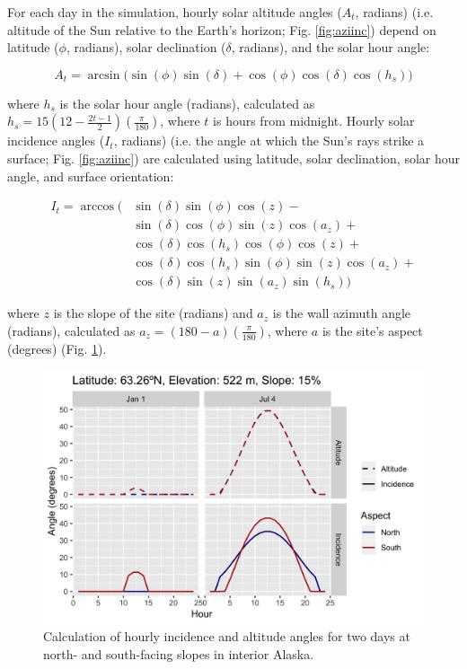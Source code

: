 \documentclass[a4paper, 12pt] {report}
\begin{document}
For each day in the simulation, hourly solar altitude angles ($A_t$, radians) (i.e. altitude of the Sun relative to the Earth's horizon; Fig. \ref{fig:aziinc}) depend on latitude ($\phi$, radians), solar declination ($\delta$, radians), and the solar hour angle: 

\begin{equation}
A_t = \arcsin{\Big(\sin{(\phi)}\sin{(\delta)} + \cos{(\phi)}\cos{(\delta)}\cos{(h_s)}\Big)}
\end{equation}

where $h_s$ is the solar hour angle (radians), calculated as $h_s = 15(12 - \frac{2t - 1}{2})(\frac{\pi}{180})$, where $t$ is hours from midnight. Hourly solar incidence angles ($I_t$, radians) (i.e. the angle at which the Sun's rays strike a surface; Fig. \ref{fig:aziinc}) are calculated using latitude, solar declination, solar hour angle, and surface orientation:

\begin{equation}
  \begin{split}
    I_t = \arccos\Big( & \sin{(\delta)}\sin{(\phi)}\cos{(z)} - \\
    & \sin{(\delta)}\cos{(\phi)}\sin{(z)}\cos{(a_z)} +  \\
     &  \cos{(\delta)}\cos{(h_s)}\cos{(\phi)}\cos{(z)} + \\
     & \cos{(\delta)}\cos{(h_s)}\sin{(\phi)}\sin{(z)}\cos{(a_z)} + \\
     & \cos{(\delta)}\sin{(z)}\sin{(a_z)}\sin{(h_s)}\Big)
  \end{split}
\end{equation}

where $z$ is the slope of the site (radians) and $a_z$ is the wall azimuth angle (radians), calculated as $a_z = (180-a)(\frac{\pi}{180})$, where $a$ is the site's aspect (degrees) (Fig. \ref{fig:angles}).

\begin{figure}
  \includegraphics[width=0.8\linewidth]{Figures/Solar_Angles.png}
  \caption{Calculation of hourly incidence and altitude angles for two days at north- and south-facing slopes in interior Alaska.}
  \label{fig:angles}
\end{figure}
\end{document}

